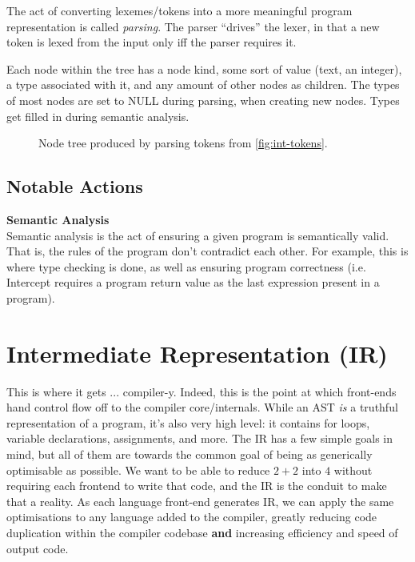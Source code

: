 \documentclass[12pt]{article}
\begin{document}
The act of converting lexemes/tokens into a more meaningful program representation is called \emph{parsing}. The parser ``drives'' the lexer, in that a new token is lexed from the input only iff the parser requires it.

Each node within the tree has a node kind, some sort of value (text, an integer), a type associated with it, and any amount of other nodes as children. The types of most nodes are set to NULL during parsing, when creating new nodes. Types get filled in during semantic analysis.

\begin{figure}[h]
  \centering
  \caption{Node tree produced by parsing tokens from \autoref{fig:int-tokens}.}
  \label{fig:int-tree}
\end{figure}
\FloatBarrier

\subsection{Notable Actions}
\label{subsec:node-tree:notable-actions}

\noindent\textbf{Semantic Analysis}\\
Semantic analysis is the act of ensuring a given program is semantically valid. That is, the rules of the program don't contradict each other. For example, this is where type checking is done, as well as ensuring program correctness (i.e. Intercept requires a program return value as the last expression present in a program).

\section{Intermediate Representation (IR)}
\label{sec:ir}

This is where it gets ... compiler-y. Indeed, this is the point at which front-ends hand control flow off to the compiler core/internals. While an AST \emph{is} a truthful representation of a program, it's also very high level: it contains for loops, variable declarations, assignments, and more. The IR has a few simple goals in mind, but all of them are towards the common goal of being as generically optimisable as possible. We want to be able to reduce $2 + 2$ into $4$ without requiring each frontend to write that code, and the IR is the conduit to make that a reality. As each language front-end generates IR, we can apply the same optimisations to any language added to the compiler, greatly reducing code duplication within the compiler codebase \textbf{and} increasing efficiency and speed of output code.
\end{document}
